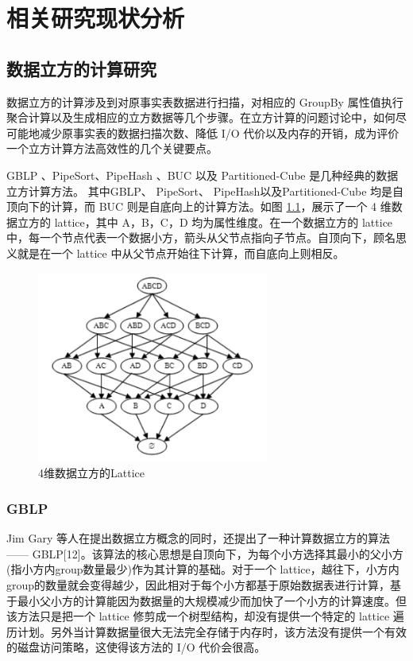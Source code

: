 \chapter{相关研究现状分析}


\section{数据立方的计算研究}

数据立方的计算涉及到对原事实表数据进行扫描，对相应的 GroupBy 属性值执行聚合计算以及生成相应的立方数据等几个步骤。在立方计算的问题讨论中，如何尽可能地减少原事实表的数据扫描次数、降低 I/O 代价以及内存的开销，成为评价一个立方计算方法高效性的几个关键要点。

GBLP \cite{gray1997data}、PipeSort、PipeHash \cite{agarwal1996computation}、BUC \cite{beyer1999bottom} 以及 Partitioned-Cube \cite{ross1997fast} 是几种经典的数据立方计算方法。 其中GBLP、 PipeSort、 PipeHash以及Partitioned-Cube 均是自顶向下的计算，而 BUC 则是自底向上的计算方法。如图 \ref{4_dimension_lattice}，展示了一个 4 维数据立方的 lattice，其中 A，B，C，D 均为属性维度。在一个数据立方的 lattice 中，每一个节点代表一个数据小方，箭头从父节点指向子节点。自顶向下，顾名思义就是在一个 lattice 中从父节点开始往下计算，而自底向上则相反。

\begin{figure}[!htb]
\centering\includegraphics[width=3in]{picture/ch_current_research/4_dimension_lattice} 
\caption{4维数据立方的Lattice}\label{4_dimension_lattice} 
\end{figure} 

\subsection{GBLP}

Jim Gary 等人在提出数据立方概念的同时，还提出了一种计算数据立方的算法 —— GBLP[12]。该算法的核心思想是自顶向下，为每个小方选择其最小的父小方(指小方内group数量最少)作为其计算的基础。对于一个 lattice，越往下，小方内group的数量就会变得越少，因此相对于每个小方都基于原始数据表进行计算，基于最小父小方的计算能因为数据量的大规模减少而加快了一个小方的计算速度。但该方法只是把一个 lattice 修剪成一个树型结构，却没有提供一个特定的 lattice 遍历计划。另外当计算数据量很大无法完全存储于内存时，该方法没有提供一个有效的磁盘访问策略，这使得该方法的 I/O 代价会很高。

